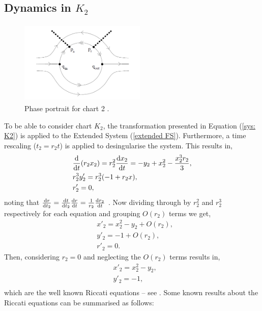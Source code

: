 \subsection{Dynamics in \texorpdfstring{$K_2$}{K2}} \label{sec: VDP K2}
\begin{figure}[h!]\centering
	\includegraphics[height=4cm,width=6cm]{Images/Dynamics_in_Chart_2}
	\caption{Phase portrait for chart 2 \citep{krupa2001}.}
	\label{fig: chart 2 fig}
\end{figure}
To be able to consider chart $ K_2$, the transformation presented in Equation (\ref{sys: K2}) is applied to the Extended System (\ref{extended FS}). Furthermore, a time rescaling ($ t_2=r_2t $) is applied to desingularise the system. This results in,
\begin{equation}
	\begin{aligned}
		&\od{}{t}(r_2x_2)=r_2^2\od{x_2}{t}=-y_2+x_2^2-\dfrac{x_2^3r_2}{3},\\
		&r^3_2y'_2=r^3_2(-1+r_2x),\\
		&r'_2=0,
	\end{aligned}
\end{equation}
noting that $ \od{r}{t_2}=\od{t}{t_2}\od{r}{t}=\frac{1}{r_2}\od{r_2}{t} $ .  Now dividing through by $ r^2_2 $ and $ r^3_2 $ respectively for each equation and grouping $O(r_2)$ terms we get,
\begin{equation}
	\begin{aligned}
		&x'_2=x^2_2-y_2+O(r_2),\\
		&y'_2=-1+O(r_2),\\
		&r'_2=0.
	\end{aligned}
\end{equation}
Then, considering $r_2=0$ and neglecting the $O(r_2)$ terms results in,
\begin{equation} \label{Riccati}
	\begin{aligned}
		&x'_2=x^2_2-y_2,\\
		&y'_2=-1,\\
	\end{aligned}
\end{equation}
which are the well known Riccati equations -- see \citet{Riccati}. Some known results about the Riccati equations can be summarised as follows:

